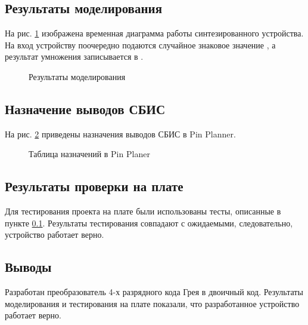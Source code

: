 \subsection{Результаты моделирования}
\label{sec:elab3_2_modeling}

На рис. \ref{fig:elab3_2_modeling} изображена временная диаграмма работы синтезированного устройства. На вход устройству поочередно подаются случайное знаковое значение , а результат умножения записывается в .

\begin{figure}[H]
\begin{center}
	\caption{Результаты моделирования}
	\label{fig:elab3_2_modeling}
\end{center}
\end{figure}

\subsection{Назначение выводов СБИС}

На рис. \ref{fig:elab3_2_pins} приведены назначения выводов СБИС в Pin Planner.

\begin{figure}[H]
\begin{center}
	\caption{Таблица назначений в Pin Planer}
	\label{fig:elab3_2_pins}
\end{center}
\end{figure}

\subsection{Результаты проверки на плате}

Для тестирования проекта на плате были использованы тесты, описанные в пункте \ref{sec:elab3_2_modeling}. Результаты тестирования совпадают с ожидаемыми, следовательно, устройство работает верно.

\subsection{Выводы}

Разработан преобразователь 4-х разрядного кода Грея в двоичный код. Результаты моделирования и тестирования на плате показали, что разработанное устройство работает верно.

